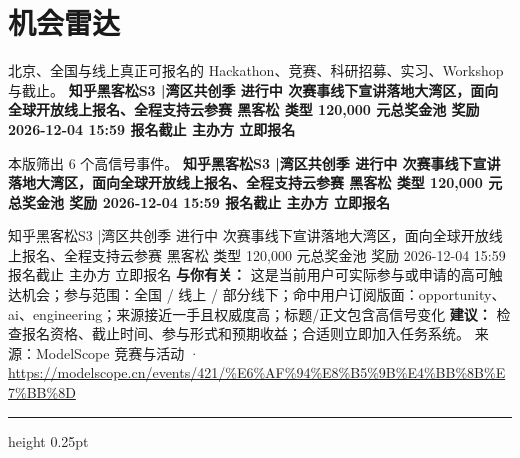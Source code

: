 \documentclass[10.5pt]{ctexart}
\begin{document}
\section*{机会雷达}
{\color{ormuted} 北京、全国与线上真正可报名的 Hackathon、竞赛、科研招募、实习、Workshop 与截止。}
\vspace{2mm}
{\LARGE\bfseries 知乎黑客松S3 |湾区共创季 进行中 次赛事线下宣讲落地大湾区，面向全球开放线上报名、全程支持云参赛 黑客松 类型 120,000 元总奖金池 奖励 2026-12-04 15:59 报名截止 主办方 立即报名}\par
\vspace{1mm}
{\color{ormuted} 本版筛出 6 个高信号事件。}
\vspace{3mm}
{\Large\bfseries 知乎黑客松S3 |湾区共创季 进行中 次赛事线下宣讲落地大湾区，面向全球开放线上报名、全程支持云参赛 黑客松 类型 120,000 元总奖金池 奖励 2026-12-04 15:59 报名截止 主办方 立即报名}\par
知乎黑客松S3 |湾区共创季 进行中 次赛事线下宣讲落地大湾区，面向全球开放线上报名、全程支持云参赛 黑客松 类型 120,000 元总奖金池 奖励 2026-12-04 15:59 报名截止 主办方 立即报名
\textbf{与你有关：} 这是当前用户可实际参与或申请的高可触达机会；参与范围：全国 / 线上 / 部分线下；命中用户订阅版面：opportunity、ai、engineering；来源接近一手且权威度高；标题/正文包含高信号变化
\textbf{建议：} 检查报名资格、截止时间、参与形式和预期收益；合适则立即加入任务系统。
{\footnotesize\color{ormuted} 来源：ModelScope 竞赛与活动 · \url{https://modelscope.cn/events/421/%E6%AF%94%E8%B5%9B%E4%BB%8B%E7%BB%8D}}
\vspace{4mm}
\hrule height 0.25pt
\vspace{3mm}
\end{document}
